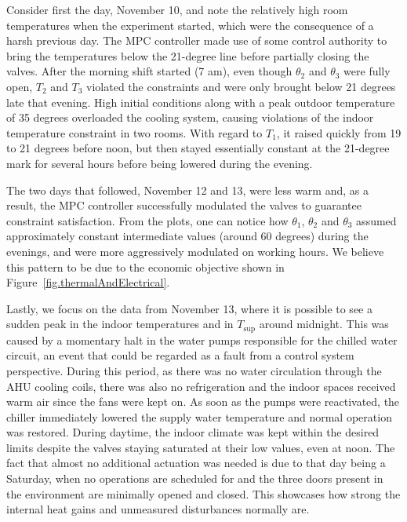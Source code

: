 Consider first the day, November 10, and note the relatively high room temperatures when the experiment started, which were the consequence of a harsh previous day. The MPC controller made use of some control authority to bring the temperatures below the 21-degree line before partially closing the valves. After the morning shift started (7 am), even though $\theta_2$ and $\theta_3$ were fully open, $T_2$ and $T_3$ violated the constraints and were only brought below 21 degrees late that evening. High initial conditions along with a peak outdoor temperature of 35 degrees overloaded the cooling system, causing violations of the indoor temperature constraint in two rooms. With regard to $T_1$, it raised quickly from 19 to 21 degrees before noon, but then stayed essentially constant at the 21-degree mark for several hours before being lowered during the evening.

The two days that followed, November 12 and 13, were less warm and, as a result, the MPC controller successfully modulated the valves to guarantee constraint satisfaction. From the plots, one can notice how $\theta_1$, $\theta_2$ and $\theta_3$ assumed  approximately constant intermediate values (around 60 degrees) during the evenings, and were more aggressively modulated on working hours. We believe this pattern to be due to the economic objective shown in Figure~\ref{fig.thermalAndElectrical}.

Lastly, we focus on the data from November 13, where it is possible to see a sudden peak in the indoor temperatures and in $T_{\text{sup}}$ around midnight. This was caused by a momentary halt in the water pumps responsible for the chilled water circuit, an event that could be regarded as a fault from a control system perspective. During this period, as there was no water circulation through the AHU cooling coils, there was also no refrigeration and the indoor spaces received warm air since the fans were kept on. As soon as the pumps were reactivated, the chiller immediately lowered the supply water temperature and normal operation was restored. During daytime, the indoor climate was kept within the desired limits despite the valves staying saturated at their low values, even at noon. The fact that almost no additional actuation was needed is due to that day being a Saturday, when no operations are scheduled for and the three doors present in the environment are minimally opened and closed. This showcases how strong the internal heat gains and unmeasured disturbances normally are.

